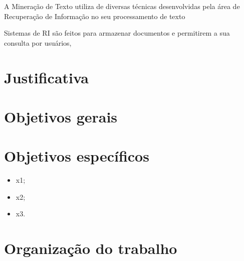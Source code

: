    
    A Mineração de Texto utiliza de diversas técnicas desenvolvidas pela área de Recuperação de Informação no seu processamento de texto
    
    Sistemas de RI são feitos para armazenar documentos e permitirem a sua consulta por usuários, 




    \section{Justificativa} \label{sec:Justificativa}



    \section{Objetivos gerais} \label{sec:Objetivos-gerais}


    \section{Objetivos específicos} \label{sec:Objetivos-específicos}
    
    \begin{itemize}
    	\item x1;
        \item x2;
        \item x3.
    \end{itemize}
    
    \section{Organização do trabalho} \label{sec:Organização-do-trabalho}

